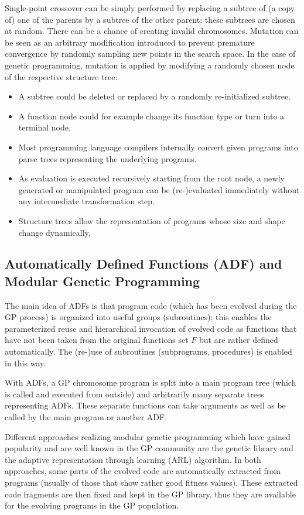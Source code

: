 \documentclass[12pt]{book}
\newcounter{subsubsubsection}[subsubsection]
\begin{document}
Single-point crossover can be simply performed by replacing a subtree of (a copy of) one of the parents by a subtree of the other parent; these subtrees are chosen at random. There can be a chance of creating invalid chromosomes. Mutation can be seen as an arbitrary modification introduced to prevent premature convergence by randomly sampling new points in the search space. In the case of genetic programming, mutation is applied by modifying a randomly chosen node of the respective structure tree:
\begin{itemize}
\item A subtree could be deleted or replaced by a randomly re-initialized subtree.
\item A function node could for example change its function type or turn into a terminal node.
\end{itemize}
\begin{itemize}
\item Most programming language compilers internally convert given programs into parse trees representing the underlying programs.
\item As evaluation is executed recursively starting from the root node, a newly generated or manipulated program can be (re-)evaluated immediately without any intermediate transformation step.
\item Structure trees allow the representation of programs whose size and shape change dynamically.
\end{itemize}
\subsection{Automatically Defined Functions (ADF) and Modular Genetic Programming}
The main idea of ADFs is that program code (which has been evolved during the GP process) is organized into useful groups (subroutines); this enables the parameterized reuse and hierarchical invocation of evolved code as functions that have not been taken from the original functions set $F$ but are rather defined automatically. The (re-)use of subroutines (subprograms, procedures) is enabled in this way.

With ADFs, a GP chromosome program is split into a main program tree (which is called and executed from outside) and arbitrarily many separate trees representing ADFs. These separate functions can take arguments as well as be called by the main program or another ADF.

Different approaches realizing modular genetic programming which have gained popularity and are well known in the GP community are the genetic library and the adaptive representation through learning (ARL) algorithm. In both approaches, some parts of the evolved code are automatically extracted from programs (usually of those that show rather good fitness values). These extracted code fragments are then fixed and kept in the GP library, thus they are available for the evolving programs in the GP population.
\end{document}
